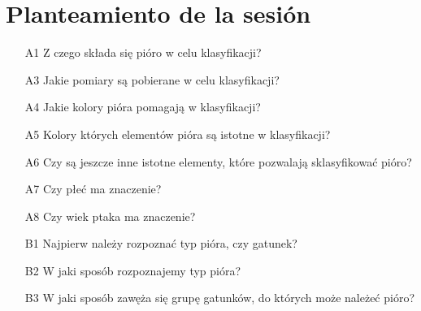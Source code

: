 \documentclass[a4paper,12pt]{article}
\begin{document}
\section{Planteamiento de la sesión}
\begin{itemize}
	\item[A1] Z czego składa się pióro w celu klasyfikacji?
	\item[A3] Jakie pomiary są pobierane w celu klasyfikacji?
	\item[A4] Jakie kolory pióra pomagają w klasyfikacji?
	\item[A5] Kolory których elementów pióra są istotne w klasyfikacji?
	\item[A6] Czy są jeszcze inne istotne elementy, które pozwalają sklasyfikować pióro?
	\item[A7] Czy płeć ma znaczenie?
	\item[A8] Czy wiek ptaka ma znaczenie?
	\item[B1] Najpierw należy rozpoznać typ pióra, czy gatunek?
	\item[B2] W jaki sposób rozpoznajemy typ pióra?
	\item[B3] W jaki sposób zawęża się grupę gatunków, do których może należeć pióro?
\end{itemize}
\end{document}
